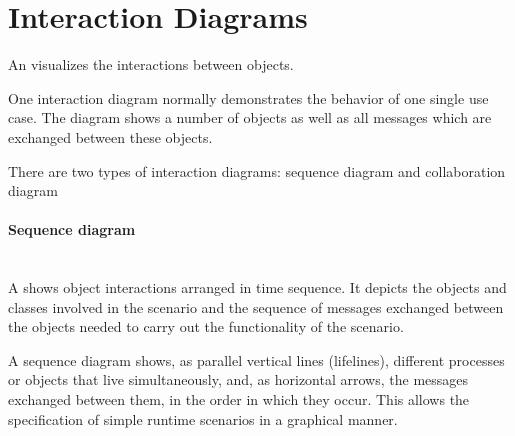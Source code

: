 \begin{minipage}[c]{0.45\linewidth}
\section{Interaction Diagrams}
An  visualizes the interactions between
objects.

One interaction diagram normally demonstrates the behavior of one
single use case. The diagram shows a number of objects as well as
all messages which are exchanged between these objects.

There are two types of interaction diagrams:
sequence diagram and collaboration diagram

%
\paragraph{Sequence diagram}\mbox{} \\
A  shows object interactions arranged in time sequence.
It depicts the objects and classes involved in the scenario and the sequence
of messages exchanged between the objects needed to carry out the
functionality of the scenario.

A sequence diagram shows, as parallel vertical lines (lifelines),
different processes or objects that live simultaneously, and, as
horizontal arrows, the messages exchanged between them, in the order in
which they occur. This allows the specification of simple runtime scenarios
in a graphical manner.


%
%


\end{minipage}
